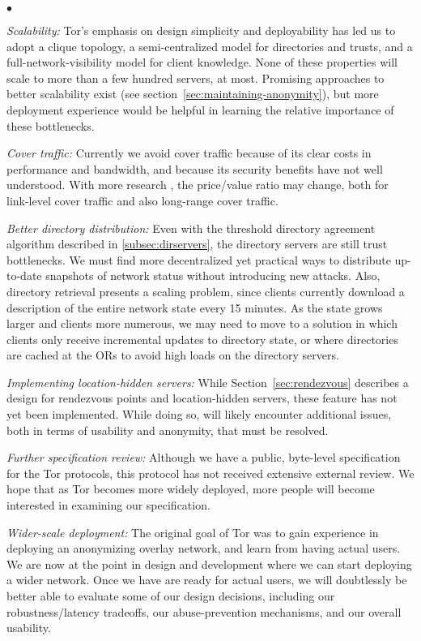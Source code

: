 \documentclass[times,10pt,twocolumn]{article}
\newenvironment{tightlist}{\begin{list}{$\bullet$}{
  \setlength{\itemsep}{0mm}
    \setlength{\parsep}{0mm}
    }}{\end{list}}
\begin{document}
%
\begin{tightlist}
\item \emph{Scalability:} Tor's emphasis on design simplicity and
  deployability has led us to adopt a clique topology, a
  semi-centralized model for directories and trusts, and a
  full-network-visibility model for client knowledge.  None of these
  properties will scale to more than a few hundred servers, at most.
  Promising approaches to better scalability exist (see
  section~\ref{sec:maintaining-anonymity}), but more deployment
  experience would be helpful in learning the relative importance of
  these bottlenecks.
\item \emph{Cover traffic:} Currently we avoid cover traffic because
  of its clear costs in performance and bandwidth, and because its
  security benefits have not well understood. With more research
  \cite{SS03,defensive-dropping}, the price/value ratio may change,
  both for link-level cover traffic and also long-range cover traffic.
\item \emph{Better directory distribution:} Even with the threshold
  directory agreement algorithm described in \ref{subsec:dirservers},
  the directory servers are still trust bottlenecks. We must find more
  decentralized yet practical ways to distribute up-to-date snapshots of
  network status without introducing new attacks.  Also, directory
  retrieval presents a scaling problem, since clients currently
  download a description of the entire network state every 15
  minutes.  As the state grows larger and clients more numerous, we
  may need to move to a solution in which clients only receive
  incremental updates to directory state, or where directories are
  cached at the ORs to avoid high loads on the directory servers.
\item \emph{Implementing location-hidden servers:} While
  Section~\ref{sec:rendezvous} describes a design for rendezvous
  points and location-hidden servers, these feature has not yet been
  implemented.  While doing so, will likely encounter additional
  issues, both in terms of usability and anonymity, that must be
  resolved.
\item \emph{Further specification review:} Although we have a public,
  byte-level specification for the Tor protocols, this protocol has
  not received extensive external review.  We hope that as Tor
  becomes more widely deployed, more people will become interested in
  examining our specification.
\item \emph{Wider-scale deployment:} The original goal of Tor was to
  gain experience in deploying an anonymizing overlay network, and
  learn from having actual users.  We are now at the point in design
  and development where we can start deploying a wider network.  Once
  we have are ready for actual users, we will doubtlessly be better
  able to evaluate some of our design decisions, including our
  robustness/latency tradeoffs, our abuse-prevention mechanisms, and
  our overall usability.
\end{tightlist}
\end{document}
